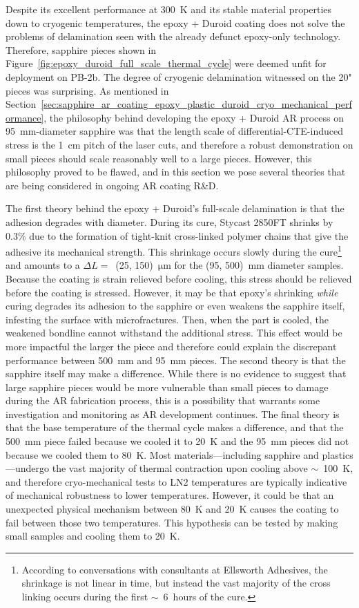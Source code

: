 Despite its excellent performance at 300~K and its stable material properties down to cryogenic temperatures, the epoxy + Duroid coating does not solve the problems of delamination seen with the already defunct epoxy-only technology. Therefore, sapphire pieces shown in Figure~\ref{fig:epoxy_duroid_full_scale_thermal_cycle} were deemed unfit for deployment on PB-2b. The degree of cryogenic delamination witnessed on the 20" pieces was surprising. As mentioned in Section~\ref{sec:sapphire_ar_coating_epoxy_plastic_duroid_cryo_mechanical_performance}, the philosophy behind developing the epoxy + Duroid AR process on 95~mm-diameter sapphire was that the length scale of differential-CTE-induced stress is the 1~cm pitch of the laser cuts, and therefore a robust demonstration on small pieces should scale reasonably well to a large pieces. However, this philosophy proved to be flawed, and in this section we pose several theories that are being considered in ongoing AR coating R\&D.

The first theory behind the epoxy + Duroid's full-scale delamination is that the adhesion degrades with diameter. During its cure, Stycast 2850FT  shrinks by 0.3\% due to the formation of tight-knit cross-linked polymer chains that give the adhesive its mechanical strength. This shrinkage occurs slowly during the cure\footnote{According to conversations with consultants at Ellsworth Adhesives, the shrinkage is not linear in time, but instead the vast majority of the cross linking occurs during the first $\sim$~6~hours of the cure.} and amounts to a $\Delta L =$~(25, 150)~$\mathrm{\mu m}$ for the (95, 500)~mm diameter samples. Because the coating is strain relieved before cooling, this stress should be relieved before the coating is stressed. However, it may be that epoxy's shrinking \textit{while} curing degrades its adhesion to the sapphire or even weakens the sapphire itself, infesting the surface with microfractures. Then, when the part is cooled, the weakened bondline cannot withstand the additional stress. This effect would be more impactful the larger the piece and therefore could explain the discrepant performance between 500~mm and 95~mm pieces. The second theory is that the sapphire itself may make a difference. While there is no evidence to suggest that large sapphire pieces would be more vulnerable than small pieces to damage during the AR fabrication process, this is a possibility that warrants some investigation and monitoring as AR development continues. The final theory is that the base temperature of the thermal cycle makes a difference, and that the 500~mm piece failed because we cooled it to 20~K and the 95~mm pieces did not because we cooled them to 80~K. Most materials---including sapphire and plastics---undergo the vast majority of thermal contraction upon cooling above $\sim$~100~K, and therefore cryo-mechanical tests to LN2 temperatures are typically indicative of mechanical robustness to lower temperatures. However, it could be that an unexpected physical mechanism between 80~K and 20~K causes the coating to fail between those two temperatures. This hypothesis can be tested by making small samples and cooling them to 20~K.

